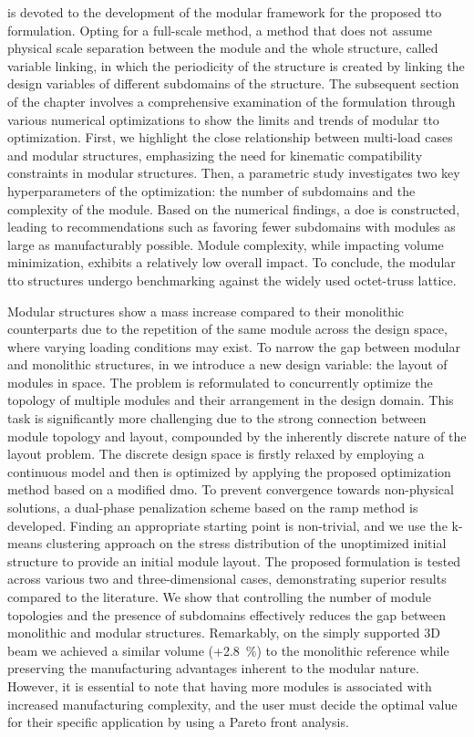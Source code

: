  is devoted to the development of the modular framework for the proposed \gls{tto} formulation. Opting for a full-scale method, a method that does not assume physical scale separation between the module and the whole structure, called variable linking, in which the periodicity of the structure is created by linking the design variables of different subdomains of the structure. The subsequent section of the chapter involves a comprehensive examination of the formulation through various numerical optimizations to show the limits and trends of modular \gls{tto} optimization. First, we highlight the close relationship between multi-load cases and modular structures, emphasizing the need for kinematic compatibility constraints in modular structures. Then, a parametric study investigates two key hyperparameters of the optimization: the number of subdomains and the complexity of the module. Based on the numerical findings, a \gls{doe} is constructed, leading to recommendations such as favoring fewer subdomains with modules as large as manufacturably possible. Module complexity, while impacting volume minimization, exhibits a relatively low overall impact. To conclude, the modular \gls{tto} structures undergo benchmarking against the widely used octet-truss lattice.

Modular structures show a mass increase compared to their monolithic counterparts due to the repetition of the same module across the design space, where varying loading conditions may exist. To narrow the gap between modular and monolithic structures, in  we introduce a new design variable: the layout of modules in space. The problem is reformulated to concurrently optimize the topology of multiple modules and their arrangement in the design domain. This task is significantly more challenging due to the strong connection between module topology and layout, compounded by the inherently discrete nature of the layout problem. The discrete design space is firstly relaxed by employing a continuous model and then is optimized by applying the proposed optimization method based on a modified \gls{dmo}. To prevent convergence towards non-physical solutions, a dual-phase penalization scheme based on the \gls{ramp} method is developed. Finding an appropriate starting point is non-trivial, and we use the k-means clustering approach on the stress distribution of the unoptimized initial structure to provide an initial module layout. The proposed formulation is tested across various two and three-dimensional cases, demonstrating superior results compared to the literature. We show that controlling the number of module topologies and the presence of subdomains effectively reduces the gap between monolithic and modular structures. Remarkably, on the simply supported 3D beam we achieved a similar volume (+\qty{2.8}{\percent}) to the monolithic reference while preserving the manufacturing advantages inherent to the modular nature. However, it is essential to note that having more modules is associated with increased manufacturing complexity, and the user must decide the optimal value for their specific application by using a Pareto front analysis.

